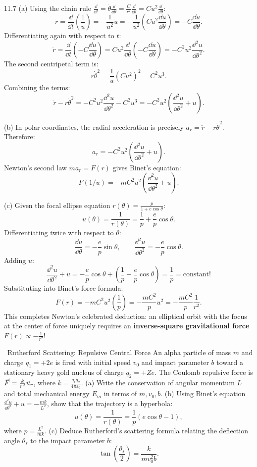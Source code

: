 \begin{tabletworkspace}[6.5cm]
\end{tabletworkspace}

\begin{solution}{11.7}
(a) Using the chain rule $\frac{\dd}{\dd t} = \dot{\theta}\frac{\dd}{\dd\theta} = \frac{C}{r^2}\frac{\dd}{\dd\theta} = Cu^2\frac{\dd}{\dd\theta}$:
\[
\dot{r} = \frac{\dd}{\dd t}\left(\frac{1}{u}\right) = -\frac{1}{u^2}\dot{u} = -\frac{1}{u^2}\left(Cu^2\frac{\dd u}{\dd\theta}\right) = \boxed{-C\frac{\dd u}{\dd\theta}.}
\]
Differentiating again with respect to $t$:
\[
\ddot{r} = \frac{\dd}{\dd t}\left(-C\frac{\dd u}{\dd\theta}\right) = Cu^2\frac{\dd}{\dd\theta}\left(-C\frac{\dd u}{\dd\theta}\right) = -C^2 u^2\frac{\dd^2 u}{\dd\theta^2}.
\]
The second centripetal term is:
\[
r\dot{\theta}^2 = \frac{1}{u}\left(Cu^2\right)^2 = C^2 u^3.
\]
Combining the terms:
\[
\ddot{r} - r\dot{\theta}^2 = -C^2 u^2\frac{\dd^2 u}{\dd\theta^2} - C^2 u^3 = \boxed{-C^2 u^2\left(\frac{\dd^2 u}{\dd\theta^2} + u\right).}
\]

(b) In polar coordinates, the radial acceleration is precisely $a_r = \ddot{r} - r\dot{\theta}^2$. Therefore:
\[
\boxed{a_r = -C^2 u^2\left(\frac{\dd^2 u}{\dd\theta^2} + u\right).}
\]
Newton's second law $m a_r = F(r)$ gives Binet's equation:
\[
F(1/u) = -m C^2 u^2\left(\frac{\dd^2 u}{\dd\theta^2} + u\right).
\]

(c) Given the focal ellipse equation $r(\theta) = \frac{p}{1 + e\cos\theta}$:
\[
u(\theta) = \frac{1}{r(\theta)} = \frac{1}{p} + \frac{e}{p}\cos\theta.
\]
Differentiating twice with respect to $\theta$:
\[
\frac{\dd u}{\dd\theta} = -\frac{e}{p}\sin\theta,\qquad \frac{\dd^2 u}{\dd\theta^2} = -\frac{e}{p}\cos\theta.
\]
Adding $u$:
\[
\frac{\dd^2 u}{\dd\theta^2} + u = -\frac{e}{p}\cos\theta + \left(\frac{1}{p} + \frac{e}{p}\cos\theta\right) = \frac{1}{p} = \text{constant!}
\]
Substituting into Binet's force formula:
\[
F(r) = -m C^2 u^2\left(\frac{1}{p}\right) = -\frac{m C^2}{p} u^2 = \boxed{-\frac{m C^2}{p}\frac{1}{r^2}.}
\]
This completes Newton's celebrated deduction: an elliptical orbit with the focus at the center of force uniquely requires an \textbf{inverse-square gravitational force} $F(r) \propto -\frac{1}{r^2}$!
\end{solution}

\begin{exercise}{\mastery\ Rutherford Scattering: Repulsive Central Force}
An alpha particle of mass $m$ and charge $q_1 = +2e$ is fired with initial speed $v_0$ and impact parameter $b$ toward a stationary heavy gold nucleus of charge $q_2 = +Ze$.
The Coulomb repulsive force is $\vec{F} = \frac{k}{r^2}\vec{u}_r$, where $k = \frac{q_1 q_2}{4\pi\varepsilon_0}$.
(a) Write the conservation of angular momentum $L$ and total mechanical energy $E_m$ in terms of $m, v_0, b$.
(b) Using Binet's equation $\frac{\dd^2 u}{\dd\theta^2} + u = -\frac{m k}{L^2}$, show that the trajectory is a hyperbola:
\[
u(\theta) = \frac{1}{r(\theta)} = \frac{1}{p}\left(e\cos\theta - 1\right),
\]
where $p = \frac{L^2}{mk}$.
(c) Deduce Rutherford's scattering formula relating the deflection angle $\theta_s$ to the impact parameter $b$:
\[
\tan\left(\frac{\theta_s}{2}\right) = \frac{k}{m v_0^2 b}.
\]
\end{exercise}

